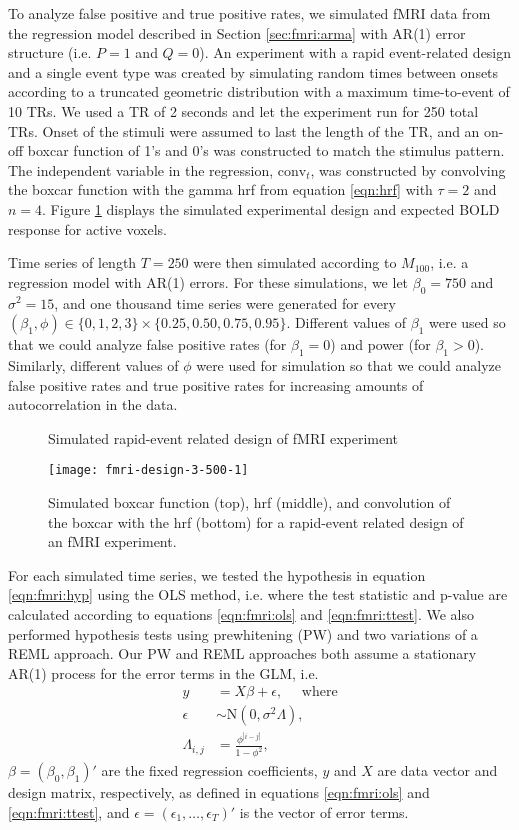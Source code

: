 To analyze false positive and true positive rates, we simulated fMRI data from the regression model described in Section \ref{sec:fmri:arma} with AR(1) error structure (i.e. $P = 1$ and $Q = 0$). An experiment with a rapid event-related design and a single event type was created by simulating random times between onsets according to a truncated geometric distribution with a maximum time-to-event of 10 TRs. We used a TR of 2 seconds and let the experiment run for 250 total TRs. Onset of the stimuli were assumed to last the length of the TR, and an on-off boxcar function of 1's and 0's was constructed to match the stimulus pattern. The independent variable in the regression, $\mbox{conv}_t$, was constructed by convolving the boxcar function with the gamma hrf from equation \eqref{eqn:hrf} with $\tau = 2$ and $n = 4$. Figure \ref{fig:fmri:design} displays the simulated experimental design and expected BOLD response for active voxels.

Time series of length $T = 250$ were then simulated according to $M_{100}$, i.e. a regression model with AR(1) errors. For these simulations, we let $\beta_0 = 750$ and $\sigma^2 = 15$, and one thousand time series were generated for every $(\beta_1,\phi) \in \{0,1,2,3\}\times\{0.25,0.50,0.75,0.95\}$. Different values of $\beta_1$ were used so that we could analyze false positive rates (for $\beta_1 = 0$) and power (for $\beta_1 > 0$). Similarly, different values of $\phi$ were used for simulation so that we could analyze false positive rates and true positive rates for increasing amounts of autocorrelation in the data.

\begin{figure}
\ssp
\centering
\caption{Simulated rapid-event related design of fMRI experiment} \label{fig:fmri:design}
\texttt{[image: fmri-design-3-500-1]}
\caption*{Simulated boxcar function (top), hrf (middle), and convolution of the boxcar with the hrf (bottom) for a rapid-event related design of an fMRI experiment.}
\end{figure}

For each simulated time series, we tested the hypothesis in equation \eqref{eqn:fmri:hyp} using the OLS method, i.e. where the test statistic and p-value are calculated according to equations \eqref{eqn:fmri:ols} and \eqref{eqn:fmri:ttest}. We also performed hypothesis tests using prewhitening (PW) and two variations of a REML approach. Our PW and REML approaches both assume a stationary AR(1) process for the error terms in the GLM, i.e.
\begin{align}
y &= X\beta + \epsilon, \quad \mbox{ where} \label{eqn:fmri:ar1} \\
\epsilon &\sim \mbox{N}(0,\sigma^2\Lambda), \nonumber \\
\Lambda_{i,j} &= \frac{\phi^{|i-j|}}{1 - \phi^2}, \nonumber
\end{align}
$\beta = (\beta_0,\beta_1)'$ are the fixed regression coefficients, $y$ and $X$ are data vector and design matrix, respectively, as defined in equations \eqref{eqn:fmri:ols} and \eqref{eqn:fmri:ttest}, and $\epsilon = (\epsilon_1,\ldots,\epsilon_T)'$ is the vector of error terms.
 
